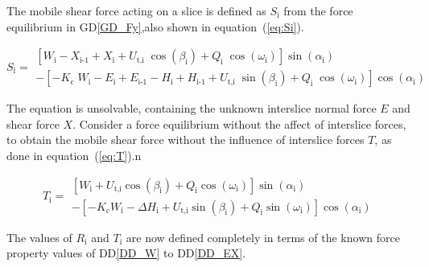 \documentclass[12pt]{article}
\newcommand{\ddref}[1]{DD\ref{#1}}
\newcommand{\dref}[1]{GD\ref{#1}}
\begin{document}
\noindent
The mobile shear force acting on a slice is defined as $S_\text{i}$
from the force equilibrium in \dref{GD_Fy},also shown in
equation~(\ref{eq:Si}).

\begin{equation}  \label{eq:Si}
  S_{\text{i}} = \begin{array}{l} \left[ W_{\text{i}} -X_{\text{i-1}}
      + X_{\text{i}} +
      {U_{\text{t,i}}}\;{\cos\left(\beta_{\text{i}}\right)} +
      Q_{\text{i}}\;{\cos\left(\omega_{\text{i}}\right)}
      \right]\sin\left(\alpha_{\text{i}}\right) \\ - \left[
      {-K_{\text{c}}}\;{W_{\text{i}}} - E_{\text{i}} + E_{\text{i-1}}
      - H_{\text{i}} + H_{\text{i-1}} +
      {U_{\text{t,i}}}\;{\sin\left(\beta_{\text{i}}\right)} +
      Q_{\text{i}}\;{\cos\left(\omega_{\text{i}}\right)}
      \right]\cos\left(\alpha_{\text{i}}\right) \end{array}
\end{equation}

\noindent
The equation is unsolvable, containing the unknown interslice normal
force $E$ and shear force $X$.  Consider a force equilibrium without
the affect of interslice forces, to obtain the mobile shear force
without the influence of interslice forces $T$, as done in
equation~(\ref{eq:T}).n

\begin{equation}  \label{eq:T} T_{\text{i}} =
  \begin{array}{l}  
\left[ W_{\text{i}} + U_{\text{t,i}} \cos\left(\beta_{\text{i}}\right)
  + Q_{\text{i}} \cos\left(\omega_{\text{i}}\right) \right]
\sin\left(\alpha_{\text{i}}\right) \\ - \left[ - K_{\text{c}}
  W_{\text{i}} - \Delta H_{\text{i}} + U_{\text{t,i}}
  \sin\left(\beta_{\text{i}}\right) + Q_{\text{i}}
  \sin\left(\omega_{\text{i}}\right) \right]
\cos\left(\alpha_{\text{i}}\right) \end{array}
\end{equation}

\noindent
The values of $R_\text{i}$ and $T_\text{i}$ are now defined completely
in terms of the known force property values of \ddref{DD_W} to
\ddref{DD_EX}.

~\newline

\end{document}
